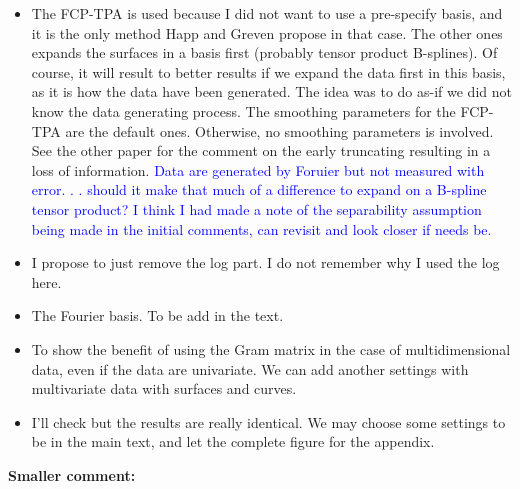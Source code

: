 \documentclass[11pt]{article}
\begin{document}
\begin{itemize}
  \item The FCP-TPA is used because I did not want to use a pre-specify basis, and it is the only method Happ and Greven propose in that case. The other ones expands the surfaces in a basis first (probably tensor product B-splines). Of course, it will result to better results if we expand the data first in this basis, as it is how the data have been generated. The idea was to do as-if we did not know the data generating process.
  The smoothing parameters for the FCP-TPA are the default ones. Otherwise, no smoothing parameters is involved. See the other paper for the comment on the early truncating resulting in a loss of information. \textcolor{blue}{Data are generated by Foruier but not measured with error. . . should it make that much of a difference to expand on a B-spline tensor product? I think I had made a note of the separability assumption being made in the initial comments, can revisit and look closer if needs be.}
  \item I propose to just remove the log part. I do not remember why I used the log here.
  \item The Fourier basis. To be add in the text.
  \item To show the benefit of using the Gram matrix in the case of multidimensional data, even if the data are univariate. We can add another settings with multivariate data with surfaces and curves.
  \item I'll check but the results are really identical. We may choose some settings to be in the main text, and let the complete figure for the appendix. 
\end{itemize}


\bigskip


\itshape


\textbf{Smaller comment:}
\end{document}
